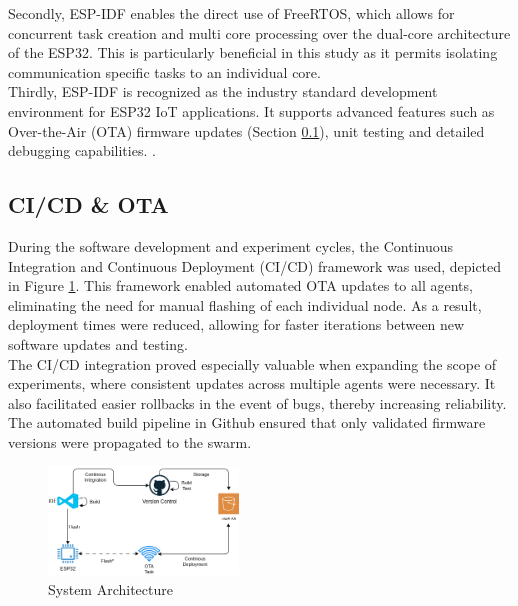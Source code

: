 \documentclass[conference]{IEEEtran}
\begin{document}
Secondly, ESP-IDF enables the direct use of FreeRTOS, which allows for concurrent task creation and multi core processing over the dual-core architecture of the ESP32. This is particularly beneficial in this study as it permits isolating communication specific tasks to an individual core.\\ 

Thirdly, ESP-IDF is recognized as the industry standard development environment for ESP32 IoT applications. It supports advanced features such as Over-the-Air (OTA) firmware updates (Section \ref{sec:ota}), unit testing and detailed debugging capabilities. \cite{expressif_freertos_nodate}.

\subsection{CI/CD \& OTA}\label{sec:ota}
During the software development and experiment cycles, the Continuous Integration and Continuous Deployment (CI/CD) framework was used, depicted in Figure \ref{fig:cicd-architecture}. This framework enabled automated OTA updates to all agents, eliminating the need for manual flashing of each individual node. As a result, deployment times were reduced, allowing for faster iterations between new software updates and testing.\\ %
The CI/CD integration proved especially valuable when expanding the scope of experiments, where consistent updates across multiple agents were necessary. It also facilitated easier rollbacks in the event of bugs, thereby increasing reliability. The automated build pipeline in Github ensured that only validated firmware versions were propagated to the swarm.\\

\begin{figure}[h]
    \centering
    \includegraphics[width=0.45\textwidth]{architecture.png}
    \caption{System Architecture}
    \label{fig:cicd-architecture}
\end{figure}
\end{document}
